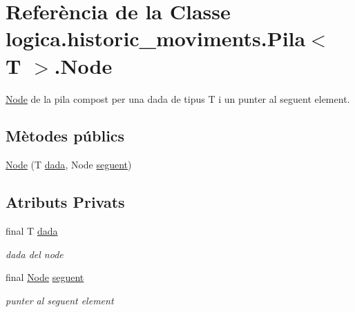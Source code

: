 \hypertarget{classlogica_1_1historic__moviments_1_1_pila_3_01_t_01_4_1_1_node}{\section{Referència de la Classe logica.\+historic\+\_\+moviments.\+Pila$<$ T $>$.Node}
\label{classlogica_1_1historic__moviments_1_1_pila_3_01_t_01_4_1_1_node}
}


\hyperlink{classlogica_1_1historic__moviments_1_1_pila_3_01_t_01_4_1_1_node}{Node} de la pila compost per una dada de tipus T i un punter al seguent element.  


\subsection*{Mètodes públics}
\begin{DoxyCompactItemize}
\item 
\hyperlink{classlogica_1_1historic__moviments_1_1_pila_3_01_t_01_4_1_1_node_ac26792f334201ca1488cbb6d538a169f}{Node} (T \hyperlink{classlogica_1_1historic__moviments_1_1_pila_3_01_t_01_4_1_1_node_a6f4fc083e03ba3766312644951151e2f}{dada}, Node \hyperlink{classlogica_1_1historic__moviments_1_1_pila_3_01_t_01_4_1_1_node_aeb64a3ab73d46d75a57405c0c20c34de}{seguent})
\end{DoxyCompactItemize}
\subsection*{Atributs Privats}
\begin{DoxyCompactItemize}
\item 
\hypertarget{classlogica_1_1historic__moviments_1_1_pila_3_01_t_01_4_1_1_node_a6f4fc083e03ba3766312644951151e2f}{final T \hyperlink{classlogica_1_1historic__moviments_1_1_pila_3_01_t_01_4_1_1_node_a6f4fc083e03ba3766312644951151e2f}{dada}}\label{classlogica_1_1historic__moviments_1_1_pila_3_01_t_01_4_1_1_node_a6f4fc083e03ba3766312644951151e2f}

\begin{DoxyCompactList}\small\item\em dada del node \end{DoxyCompactList}\item 
\hypertarget{classlogica_1_1historic__moviments_1_1_pila_3_01_t_01_4_1_1_node_aeb64a3ab73d46d75a57405c0c20c34de}{final \hyperlink{classlogica_1_1historic__moviments_1_1_pila_3_01_t_01_4_1_1_node_ac26792f334201ca1488cbb6d538a169f}{Node} \hyperlink{classlogica_1_1historic__moviments_1_1_pila_3_01_t_01_4_1_1_node_aeb64a3ab73d46d75a57405c0c20c34de}{seguent}}\label{classlogica_1_1historic__moviments_1_1_pila_3_01_t_01_4_1_1_node_aeb64a3ab73d46d75a57405c0c20c34de}

\begin{DoxyCompactList}\small\item\em punter al seguent element \end{DoxyCompactList}\end{DoxyCompactItemize}


